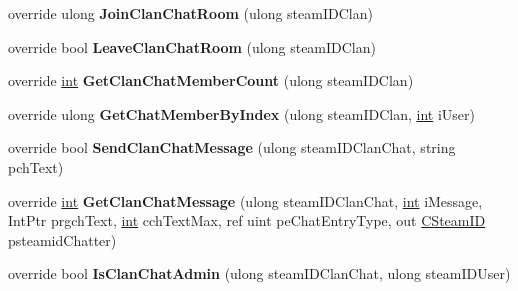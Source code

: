 \begin{DoxyCompactItemize}
\item 
\hypertarget{classValve_1_1Steamworks_1_1CSteamFriends_a2d091af1c1ccd5eade605684ac774149}{}override ulong {\bfseries Join\+Clan\+Chat\+Room} (ulong steam\+I\+D\+Clan)\label{classValve_1_1Steamworks_1_1CSteamFriends_a2d091af1c1ccd5eade605684ac774149}

\item 
\hypertarget{classValve_1_1Steamworks_1_1CSteamFriends_a1d34a30bc35f2245add368e5f9d94378}{}override bool {\bfseries Leave\+Clan\+Chat\+Room} (ulong steam\+I\+D\+Clan)\label{classValve_1_1Steamworks_1_1CSteamFriends_a1d34a30bc35f2245add368e5f9d94378}

\item 
\hypertarget{classValve_1_1Steamworks_1_1CSteamFriends_a9d6fae677e35ea037d79ab712c0cc5b0}{}override \hyperlink{SDL__thread_8h_a6a64f9be4433e4de6e2f2f548cf3c08e}{int} {\bfseries Get\+Clan\+Chat\+Member\+Count} (ulong steam\+I\+D\+Clan)\label{classValve_1_1Steamworks_1_1CSteamFriends_a9d6fae677e35ea037d79ab712c0cc5b0}

\item 
\hypertarget{classValve_1_1Steamworks_1_1CSteamFriends_a6de22c47b70a430a1217e3d5fb35c23d}{}override ulong {\bfseries Get\+Chat\+Member\+By\+Index} (ulong steam\+I\+D\+Clan, \hyperlink{SDL__thread_8h_a6a64f9be4433e4de6e2f2f548cf3c08e}{int} i\+User)\label{classValve_1_1Steamworks_1_1CSteamFriends_a6de22c47b70a430a1217e3d5fb35c23d}

\item 
\hypertarget{classValve_1_1Steamworks_1_1CSteamFriends_a6c89a26b80c3a252d2aa8d61e0e7336e}{}override bool {\bfseries Send\+Clan\+Chat\+Message} (ulong steam\+I\+D\+Clan\+Chat, string pch\+Text)\label{classValve_1_1Steamworks_1_1CSteamFriends_a6c89a26b80c3a252d2aa8d61e0e7336e}

\item 
\hypertarget{classValve_1_1Steamworks_1_1CSteamFriends_aefbfbb7288a89ada5166a026f7d74961}{}override \hyperlink{SDL__thread_8h_a6a64f9be4433e4de6e2f2f548cf3c08e}{int} {\bfseries Get\+Clan\+Chat\+Message} (ulong steam\+I\+D\+Clan\+Chat, \hyperlink{SDL__thread_8h_a6a64f9be4433e4de6e2f2f548cf3c08e}{int} i\+Message, Int\+Ptr prgch\+Text, \hyperlink{SDL__thread_8h_a6a64f9be4433e4de6e2f2f548cf3c08e}{int} cch\+Text\+Max, ref uint pe\+Chat\+Entry\+Type, out \hyperlink{structValve_1_1Steamworks_1_1CSteamID}{C\+Steam\+I\+D} psteamid\+Chatter)\label{classValve_1_1Steamworks_1_1CSteamFriends_aefbfbb7288a89ada5166a026f7d74961}

\item 
\hypertarget{classValve_1_1Steamworks_1_1CSteamFriends_ad3cc44120461b8c3ca3803500b470a8c}{}override bool {\bfseries Is\+Clan\+Chat\+Admin} (ulong steam\+I\+D\+Clan\+Chat, ulong steam\+I\+D\+User)\label{classValve_1_1Steamworks_1_1CSteamFriends_ad3cc44120461b8c3ca3803500b470a8c}


\end{DoxyCompactItemize}
